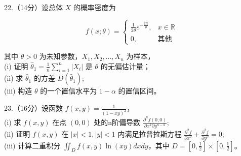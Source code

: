 \documentclass[UTF8]{ctexart}
\begin{document}
22.（14分）设总体 \( X \) 的概率密度为

\[f(x;\theta) = \begin{cases} 
\frac{1}{2\theta} e^{-\frac{|x|}{\theta}}, & x \in \mathbb{R} \\
0, & 其他 
\end{cases}\]

其中 \( \theta > 0 \) 为未知参数，\( X_1, X_2, \dots, X_n \) 为样本，\\
(i) 证明 \( \hat{\theta}_1 = \frac{1}{n} \sum_{i=1}^n |X_i| \) 是
\( \theta \) 的无偏估计量；\\
(ii) 求 \( \hat{\theta}_1 \) 的方差 \( D(\hat{\theta}_1) \);\\
(iii) 构造 \( \theta \) 的一个置信水平为 \( 1 - \alpha \) 的置信区间。

23.（16分）设函数 \( f(x,y) = \frac{1}{(1 - xy)^2} \)，\\
(i) 求 \( f(x,y) \) 在点 \( (0,0) \) 处的n阶偏导数
\( \frac{\partial^n f(0,0)}{\partial x^k \partial y^{n-k}} \);\\
(ii) 证明 \( f(x,y) \) 在 \( |x| < 1, |y| < 1 \) 内满足拉普拉斯方程
\( \frac{\partial^2 f}{\partial x^2} + \frac{\partial^2 f}{\partial y^2} = 0 \);\\
(iii) 计算二重积分 \( \iint_{D} f(x,y) \ln(xy) dxdy \)，其中
\( D = [0,\frac{1}{2}] \times [0,\frac{1}{2}] \)。
\end{document}
